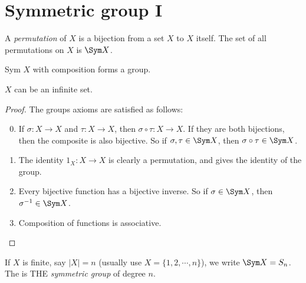 \documentclass[a4paper]{article}
\begin{document}
\section{Symmetric group I}
\begin{defi}[Permutation]
  A \emph{permutation} of $X$ is a bijection from a set $X$ to $X$ itself. The set of all permutations on $X$ is $\Sym X$.
\end{defi}

\begin{thm}
  Sym $X$ with composition forms a group.
\end{thm}
\note $X$ can be an infinite set.

\begin{proof}
  The groups axioms are satisfied as follows:
  \begin{enumerate}[label=\arabic{*}.]
      \setcounter{enumi}{-1}
    \item If $\sigma: X\to X$ and $\tau: X\to X$, then $\sigma\circ\tau:X\to X$. If they are both bijections, then the composite is also bijective. So if $\sigma, \tau\in \Sym X$, then $\sigma\circ\tau\in\Sym X$.
    \item The identity $1_X:X\to X$ is clearly a permutation, and gives the identity of the group.
    \item Every bijective function has a bijective inverse. So if $\sigma\in \Sym X$, then $\sigma^{-1} \in \Sym X$.
    \item Composition of functions is associative.
  \end{enumerate}
\end{proof}
\begin{defi}
  If $X$ is finite, say $|X| = n$ (usually use $X = \{1, 2, \cdots, n\}$), we write $\Sym X = S_n$. The is THE \emph{symmetric group} of degree $n$.
\end{defi}
\end{document}
